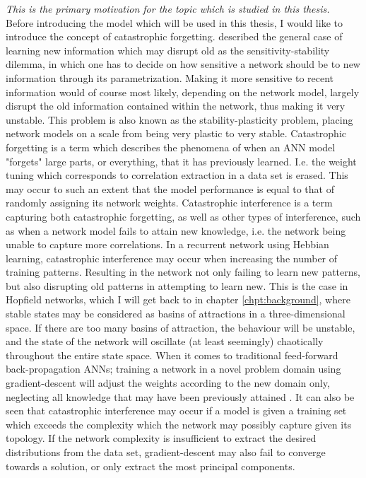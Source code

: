 \textit{This is the primary motivation for the topic which is studied in this thesis.}
\\

Before introducing the model which will be used in this thesis, I would like to introduce the concept of catastrophic forgetting.
\cite{Hebb1949} described the general case of learning new information which may disrupt old as the sensitivity-stability dilemma, in which one has to decide on how sensitive a network should be to new information through its parametrization. Making it more sensitive to recent information would of course most likely, depending on the network model, largely disrupt the old information contained within the network, thus making it very unstable. This problem is also known as the stability-plasticity \citep{Carpenter1987} problem, placing network models on a scale from being very plastic to very stable.
Catastrophic forgetting \citep{McCloskey1989, Ratcliff1990} is a term which describes the phenomena of when an ANN model "forgets" large parts, or everything, that it has previously learned. I.e. the weight tuning which corresponds to correlation extraction in a data set is erased. This may occur to such an extent that the model performance is equal to that of randomly assigning its network weights. Catastrophic interference is a term capturing both catastrophic forgetting, as well as other types of interference, such as when a network model fails to attain new knowledge, i.e. the network being unable to capture more correlations. In a recurrent network using Hebbian learning, catastrophic interference may occur when increasing the number of training patterns. Resulting in the network not only failing to learn new patterns, but also disrupting old patterns in attempting to learn new. This is the case in Hopfield networks, which I will get back to in chapter \ref{chpt:background}, where stable states may be considered as basins of attractions in a three-dimensional space. If there are too many basins of attraction, the behaviour will be unstable, and the state of the network will oscillate (at least seemingly) chaotically throughout the entire state space.
When it comes to traditional feed-forward back-propagation ANNs; training a network in a novel problem domain using gradient-descent will adjust the weights according to the new domain only, neglecting all knowledge that may have been previously attained \citep{McCloskey1989, French1999, French2001}.
It can also be seen that catastrophic interference may occur if a model is given a training set which exceeds the complexity which the network may possibly capture given its topology. If the network complexity is insufficient to extract the desired distributions from the data set, gradient-descent may also fail to converge towards a solution, or only extract the most principal components.

